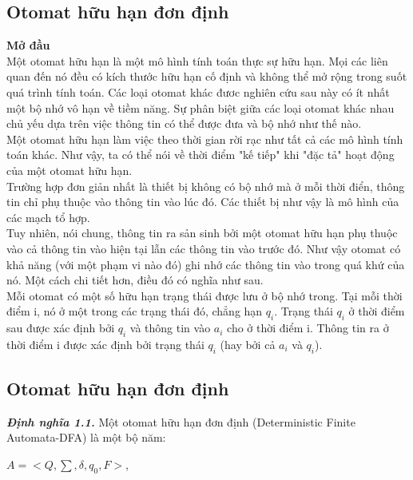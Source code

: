 \begin{flushleft}
\section{Otomat hữu hạn đơn định}
\textbf{Mở đầu}\\
\hspace{10mm}Một otomat hữu hạn là một mô hình tính toán thực sự hữu hạn. Mọi các liên quan đến nó đều có kích thước hữu hạn cố định và không thể mở rộng trong suốt quá trình tính toán. Các loại otomat khác đươc nghiên cứu sau này có ít nhất một bộ nhớ vô hạn về tiềm năng. Sự phân biệt giữa các loại otomat khác nhau chủ yếu dựa trên việc thông tin có thể được đưa và bộ nhớ như thế nào.\\
Một otomat hữu hạn làm việc theo thời gian rời rạc như tất cả các mô hình tính toán khác. Như vậy, ta có thể nói về thời điểm "kế tiếp" khi "đặc tả" hoạt động 
của một otomat hữu hạn.\\
Trường hợp đơn giản nhất là thiết bị không có bộ nhớ mà ở mỗi thời điển, thông tin chỉ phụ thuộc vào thông tin vào lúc đó. Các thiết bị như vậy là mô hình của các mạch tổ hợp.\\
Tuy nhiên, nói chung, thông tin ra sản sinh bởi một otomat hữu hạn phụ thuộc vào cả thông tin vào hiện tại lẫn các thông tin vào trước đó. Như vậy otomat có khả năng (với một phạm vi nào đó) ghi nhớ các thông tin vào trong quá khứ của nó. Một cách chi tiết hơn, điều đó có nghĩa như sau.\\
Mỗi otomat có một số hữu hạn trạng thái được lưu ở bộ nhớ trong. Tại mỗi thời điểm i, nó ở một trong các trạng thái đó, chẳng hạn $q_i$. Trạng thái $q_i$ ở thời điểm sau được xác định bởi $q_i$ và thông tin vào $a_i$ cho ở thời điểm i. Thông tin ra ở thời điểm i được xác định bởi trạng thái $q_i$ (hay bởi cả $a_i$ và $q_i$).\\

\subsection{Otomat hữu hạn đơn định}

\textbf{\textit{Định nghĩa 1.1.}} Một otomat hữu hạn đơn định (Deterministic Finite Automata-DFA) là một bộ năm:
\end{flushleft}
$A = <Q, \sum, \delta, q_0, F>$,
